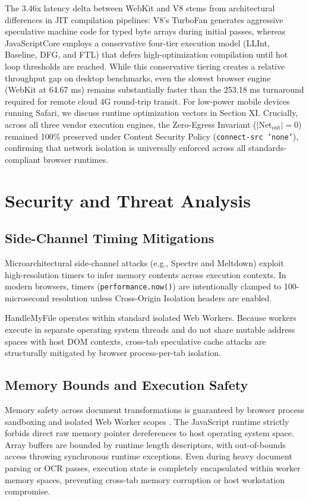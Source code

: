 \documentclass[journal]{IEEEtran}
\begin{document}
The 3.46x latency delta between WebKit and V8 stems from architectural differences in JIT compilation pipelines: V8's TurboFan generates aggressive speculative machine code for typed byte arrays during initial passes, whereas JavaScriptCore employs a conservative four-tier execution model (LLInt, Baseline, DFG, and FTL) that defers high-optimization compilation until hot loop thresholds are reached. While this conservative tiering creates a relative throughput gap on desktop benchmarks, even the slowest browser engine (WebKit at 64.67 ms) remains substantially faster than the 253.18 ms turnaround required for remote cloud 4G round-trip transit. For low-power mobile devices running Safari, we discuss runtime optimization vectors in Section XI. Crucially, across all three vendor execution engines, the Zero-Egress Invariant ($|\text{Net}_{\text{out}}| = 0$) remained 100\% preserved under Content Security Policy (\texttt{connect-src 'none'}), confirming that network isolation is universally enforced across all standards-compliant browser runtimes.

\section{Security and Threat Analysis}

\subsection{Side-Channel Timing Mitigations}
Microarchitectural side-channel attacks (e.g., Spectre and Meltdown) exploit high-resolution timers to infer memory contents across execution contexts. In modern browsers, timers (\texttt{performance.now()}) are intentionally clamped to 100-microsecond resolution unless Cross-Origin Isolation headers are enabled.

HandleMyFile operates within standard isolated Web Workers. Because workers execute in separate operating system threads and do not share mutable address spaces with host DOM contexts, cross-tab speculative cache attacks are structurally mitigated by browser process-per-tab isolation.

\subsection{Memory Bounds and Execution Safety}
Memory safety across document transformations is guaranteed by browser process sandboxing and isolated Web Worker scopes \cite{jang2012quark}. The JavaScript runtime strictly forbids direct raw memory pointer dereferences to host operating system space. Array buffers are bounded by runtime length descriptors, with out-of-bounds access throwing synchronous runtime exceptions. Even during heavy document parsing or OCR passes, execution state is completely encapsulated within worker memory spaces, preventing cross-tab memory corruption or host workstation compromise.
\end{document}
